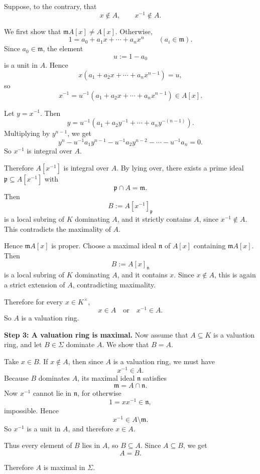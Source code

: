 \documentclass[12pt,a4paper]{article}
\theoremstyle{notespace}
\begin{document}
Suppose, to the contrary, that
\[
x\notin A,\qquad x^{-1}\notin A.
\]

We first show that \(\mathfrak m A[x]\neq A[x]\). Otherwise,
\[
1=a_0+a_1x+\cdots+a_nx^n
\qquad (a_i\in \mathfrak m).
\]
Since \(a_0\in \mathfrak m\), the element
\[
u:=1-a_0
\]
is a unit in \(A\). Hence
\[
x(a_1+a_2x+\cdots+a_nx^{n-1})=u,
\]
so
\[
x^{-1}=u^{-1}(a_1+a_2x+\cdots+a_nx^{n-1})\in A[x].
\]

Let \(y=x^{-1}\). Then
\[
y=u^{-1}(a_1+a_2y^{-1}+\cdots+a_n y^{-(n-1)}).
\]
Multiplying by \(y^{n-1}\), we get
\[
y^n-u^{-1}a_1y^{n-1}-u^{-1}a_2y^{n-2}-\cdots-u^{-1}a_n=0.
\]
So \(x^{-1}\) is integral over \(A\).

Therefore \(A[x^{-1}]\) is integral over \(A\). By lying over, there exists a prime ideal \(\mathfrak p\subseteq A[x^{-1}]\) with
\[
\mathfrak p\cap A=\mathfrak m.
\]
Then
\[
B:=A[x^{-1}]_{\mathfrak p}
\]
is a local subring of \(K\) dominating \(A\), and it strictly contains \(A\), since \(x^{-1}\notin A\). This contradicts the maximality of \(A\).

Hence \(\mathfrak m A[x]\) is proper. Choose a maximal ideal \(\mathfrak n\) of \(A[x]\) containing \(\mathfrak m A[x]\). Then
\[
B:=A[x]_{\mathfrak n}
\]
is a local subring of \(K\) dominating \(A\), and it contains \(x\). Since \(x\notin A\), this is again a strict extension of \(A\), contradicting maximality.

Therefore for every \(x\in K^\times\),
\[
x\in A \quad\text{or}\quad x^{-1}\in A.
\]
So \(A\) is a valuation ring.

\medskip

\textbf{Step 3: A valuation ring is maximal.}
Now assume that \(A\subseteq K\) is a valuation ring, and let \(B\in\Sigma\) dominate \(A\). We show that \(B=A\).

Take \(x\in B\). If \(x\notin A\), then since \(A\) is a valuation ring, we must have
\[
x^{-1}\in A.
\]
Because \(B\) dominates \(A\), its maximal ideal \(\mathfrak n\) satisfies
\[
\mathfrak m=A\cap \mathfrak n.
\]
Now \(x^{-1}\) cannot lie in \(\mathfrak n\), for otherwise
\[
1=xx^{-1}\in \mathfrak n,
\]
impossible. Hence
\[
x^{-1}\in A\setminus \mathfrak m.
\]
So \(x^{-1}\) is a unit in \(A\), and therefore \(x\in A\).

Thus every element of \(B\) lies in \(A\), so \(B\subseteq A\). Since \(A\subseteq B\), we get
\[
A=B.
\]

Therefore \(A\) is maximal in \(\Sigma\).

\medskip
\end{document}
